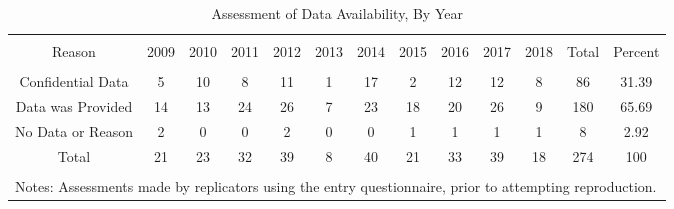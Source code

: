 
\begin{table}[!htbp] \centering 
  \caption{Assessment of Data Availability, By Year} 
  \label{tab:absence} 
\begin{tabular}{@{\extracolsep{0.4pt}} ccccccccccccc} 
\\[-1.8ex]\hline 
\hline \\[-1.8ex] 
Reason & 2009 & 2010 & 2011 & 2012 & 2013 & 2014 & 2015 & 2016 & 2017 & 2018 & Total & Percent \\ 
\hline \\[-1.8ex] 
Confidential Data & 5 & 10 & 8 & 11 & 1 & 17 & 2 & 12 & 12 & 8 & 86 & 31.39 \\ 
Data was Provided & 14 & 13 & 24 & 26 & 7 & 23 & 18 & 20 & 26 & 9 & 180 & 65.69 \\ 
No Data or Reason & 2 & 0 & 0 & 2 & 0 & 0 & 1 & 1 & 1 & 1 & 8 & 2.92 \\ 
Total & 21 & 23 & 32 & 39 & 8 & 40 & 21 & 33 & 39 & 18 & 274 & 100 \\ 
\hline \\[-1.8ex] 
\multicolumn{13}{l}{\footnotesize Notes: Assessments made  by replicators using the entry questionnaire, prior to attempting reproduction.} \\ 
\end{tabular} 
\end{table} 
